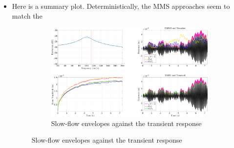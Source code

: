 \documentclass[11pt]{article}
\begin{document}
\begin{itemize}
\item Here is a summary plot. Deterministically, the MMS approaches seem to match the 
\begin{figure}
\begin{figure}[htbp]
\centering
\includegraphics[width=.9\linewidth]{FIGS/C_linsystry0.png}
\caption{Slow-flow envelopes against the transient response}
\end{figure}
\end{figure}


\end{itemize}
\end{document}
